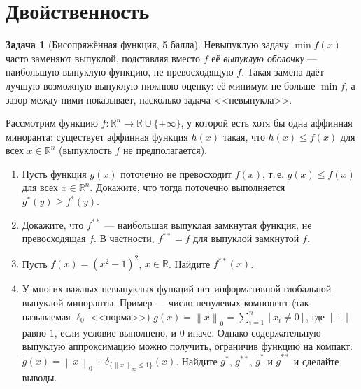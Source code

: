 \documentclass[11pt]{article}
\theoremstyle{definition}
\newtheorem{problem}{Задача}
\theoremstyle{starred}
\theoremstyle{definition}
\theoremstyle{remark}
\theoremstyle{plain}
\theoremstyle{definition}
\newcommand{\R}{\mathbb{R}}
\newcommand{\norm}[1]{\left\lVert #1 \right\rVert}
\begin{document}
\section{Двойственность}

\begin{problem}[Бисопряжённая функция, 5 балла]
Невыпуклую задачу $\min f(x)$ часто заменяют выпуклой, подставляя вместо $f$ её \emph{выпуклую оболочку} --- наибольшую выпуклую функцию, не превосходящую $f$. Такая замена даёт лучшую возможную выпуклую нижнюю оценку: её минимум не больше $\min f$, а зазор между ними показывает, насколько задача <<невыпукла>>. 

Рассмотрим функцию $f \colon \R^{n} \to \R\cup\{+\infty\}$, у которой есть хотя бы одна аффинная
миноранта: существует аффинная функция $h(x)$ такая, что $h(x)\leq f(x)$ для всех $x\in \R^n$ (выпуклость $f$ не предполагается).
\begin{enumerate}[label=(\alph*), nosep]
  \item Пусть функция $g(x)$ поточечно не превосходит $f(x)$, т.\,е. $g(x) \le f(x)$ для всех
        $x \in \R^{n}$. Докажите, что тогда поточечно выполняется $g^{*}(y) \ge f^{*}(y)$.
  \item Докажите, что $f^{**}$ --- наибольшая выпуклая замкнутая функция, не превосходящая $f$.
        В частности, $f^{**} = f$ для выпуклой замкнутой $f$.
  \item Пусть $f(x) = (x^{2} - 1)^{2}$, $x \in \R$. Найдите $f^{**}(x)$.
  \item У многих важных невыпуклых функций нет информативной глобальной выпуклой миноранты. Пример
        --- число ненулевых компонент (так называемая $\ell_0$-<<норма>>)
        $g(x) = \norm{x}_0 = \sum_{i=1}^{n} [x_i \neq 0]$, где $[\,\cdot\,]$ равно $1$, если
        условие выполнено, и $0$ иначе. Однако содержательную выпуклую аппроксимацию можно
        получить, ограничив функцию на компакт:
        $\tilde g(x) = \norm{x}_0 + \delta_{\{\norm{x}_\infty \le 1\}}(x)$.
        Найдите $g^{*}$, $g^{**}$, $\tilde g^{*}$ и $\tilde g^{**}$ и сделайте выводы.
\end{enumerate}
\end{problem}
\end{document}
